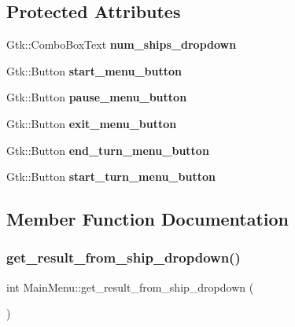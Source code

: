 \subsection*{Protected Attributes}
\begin{DoxyCompactItemize}
\item 
\mbox{\label{classMainMenu_aea4360612bdac04a913cb1d57abcbdf4}} 
Gtk\+::\+Combo\+Box\+Text {\bfseries num\+\_\+ships\+\_\+dropdown}
\item 
\mbox{\label{classMainMenu_affb7e8692845bf2037e19dc8b8a9ecdd}} 
Gtk\+::\+Button {\bfseries start\+\_\+menu\+\_\+button}
\item 
\mbox{\label{classMainMenu_ab1e4fd578eaee5d9a4bcd5c498584591}} 
Gtk\+::\+Button {\bfseries pause\+\_\+menu\+\_\+button}
\item 
\mbox{\label{classMainMenu_a3b919514d14da2a4a85fa05f5bacb330}} 
Gtk\+::\+Button {\bfseries exit\+\_\+menu\+\_\+button}
\item 
\mbox{\label{classMainMenu_a4f1f0518d2c2a59da56be3bb80675ae2}} 
Gtk\+::\+Button {\bfseries end\+\_\+turn\+\_\+menu\+\_\+button}
\item 
\mbox{\label{classMainMenu_a6bf0d04b2003e05519419b8bc21f8973}} 
Gtk\+::\+Button {\bfseries start\+\_\+turn\+\_\+menu\+\_\+button}
\end{DoxyCompactItemize}


\subsection{Member Function Documentation}
\mbox{\label{classMainMenu_ab155ec2f4fe3c5c26984118a23265ecb}} 
\subsubsection{\texorpdfstring{get\_result\_from\_ship\_dropdown()}{get\_result\_from\_ship\_dropdown()}}
{\footnotesize\ttfamily int Main\+Menu\+::get\+\_\+result\+\_\+from\+\_\+ship\+\_\+dropdown (\begin{DoxyParamCaption}{ }\end{DoxyParamCaption})\hspace{0.3cm}{\ttfamily [protected]}}



